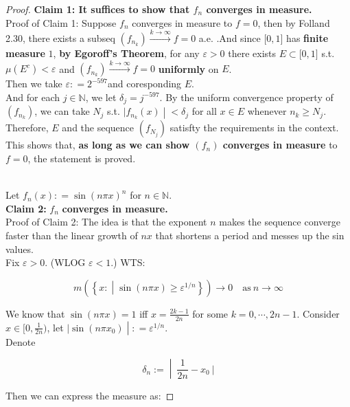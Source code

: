 \begin{proof}

\textbf{Claim 1: It suffices to show that \(f_{n}\) converges in measure.}\\
Proof of Claim 1: Suppose \(f_{n}\) converges in measure to \(f = 0\), then by Folland 2.30, there exists a subseq \((f_{n_{k}})\overset{k\rightarrow\infty}{\rightarrow}f = 0\) a.e. .And since \(\lbrack 0,1\rbrack\) has \textbf{finite measure} \(1\), \textbf{by Egoroff's Theorem}, for any \(\varepsilon > 0\) there exists \(E \subset \lbrack 0,1\rbrack\) s.t. \(\mu(E^{c}) < \varepsilon\) and \((f_{n_{k}})\overset{k\rightarrow\infty}{\rightarrow}f = 0\) \textbf{uniformly} on \(E\).\\
Then we take \(\varepsilon: = 2^{- 597}\)and coresponding \(E\).\\
And for each \(j \in \mathbb{N}\), we let \(\delta_{j} = j^{- 597}\). By the uniform convergence property of \((f_{n_{k}})\), we can take \(N_{j}\) s.t. \(\left. |f_{n_{k}}(x) \middle| < \delta_{j} \right.\) for all \(x \in E\) whenever \(n_{k} \geq N_{j}\).\\
Therefore, \(E\) and the sequence \((f_{N_{j}})\) satisfty the requirements in the context.\\
This shows that, \textbf{as long as we can show \((f_{n})\) converges in measure} to \(f = 0\), the statement is proved.\\
\strut \\
Let \(f_{n}(x): = \sin(n\pi x)^{n}\) for \(n \in \mathbb{N}\).\\
\textbf{Claim 2:} \(f_{n}\) \textbf{converges in measure.}\\
Proof of Claim 2: The idea is that the exponent \(n\) makes the sequence converge faster than the linear growth of \(nx\) that shortens a period and messes up the sin values.\\
Fix \(\varepsilon > 0\). (WLOG \(\varepsilon < 1\).) WTS:

\[m(\left\{ x: \middle| \sin(n\pi x) \geq \varepsilon^{1/n} \right\})\rightarrow 0\quad\text{as}\ n\rightarrow\infty\]

We know that \(\sin(n\pi x) = 1\) iff \(x = \frac{2k - 1}{2n}\) for some \(k = 0,\cdots,2n - 1\). Consider \(x \in \lbrack 0,\frac{1}{2n})\), let \(\left. |\sin(n\pi x_{0}) \middle| : = \varepsilon^{1/n} \right.\).\\
Denote

\[\left. \delta_{n} := \middle| \ \frac{1}{2n} - x_{0}\ | \right.\]

Then we can express the measure as:


\end{proof}
